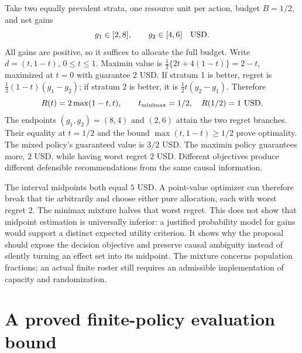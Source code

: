 Take two equally prevalent strata, one resource unit per action, budget
$B=1/2$, and net gains
\[
 g_1\in[2,8],\qquad g_2\in[4,6]\quad {\rm USD}.
\]
All gains are positive, so it suffices to allocate the full budget. Write
$d=(t,1-t)$, $0\leq t\leq1$. Maximin value is
$\tfrac12\{2t+4(1-t)\}=2-t$, maximized at $t=0$ with guarantee $2$ USD.
If stratum 1 is better, regret is
$\tfrac12(1-t)(g_1-g_2)$; if stratum 2 is better, it is
$\tfrac12t(g_2-g_1)$. Therefore
\begin{equation}
 R(t)=2\max(1-t,t),\qquad t_{\rm minimax}=1/2,\quad R(1/2)=1\ {\rm USD}.
 \label{exec17:s4-robust-example}
\end{equation}
The endpoints $(g_1,g_2)=(8,4)$ and $(2,6)$ attain the two regret branches.
Their equality at $t=1/2$ and the bound
$\max(t,1-t)\geq1/2$ prove optimality. The mixed policy's guaranteed value
is $3/2$ USD. The maximin policy guarantees more, $2$ USD, while having
worst regret $2$ USD. Different objectives produce different defensible
recommendations from the same causal information.\citep{exec17_s4_extension}

The interval midpoints both equal $5$ USD. A point-value optimizer can
therefore break that tie arbitrarily and choose either pure allocation,
each with worst regret $2$. The minimax mixture halves that worst regret.
This does not show that midpoint estimation is universally inferior:
a justified probability model for gains would support a distinct expected
utility criterion. It shows why the proposal should expose the decision
objective and preserve causal ambiguity instead of silently turning an
effect set into its midpoint. The mixture concerns population fractions;
an actual finite roster still requires an admissible implementation of
capacity and randomization.

\section{A proved finite-policy evaluation bound}
\label{exec17:s4-finite-policy}

